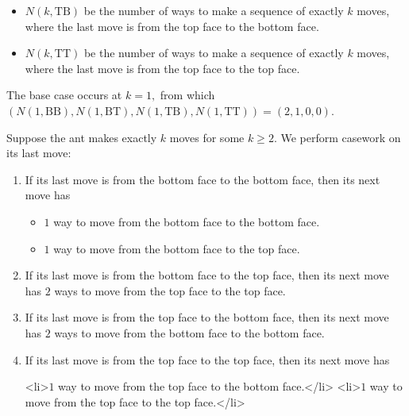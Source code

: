 \begin{enumerate}
            \begin{itemize}
        \item $N(k,\mathrm{TB})$ be the number of ways to make a sequence of exactly $k$ moves, where the last move is from the top face to the bottom face.
            \end{itemize}
            
            \begin{itemize}
        \item $N(k,\mathrm{TT})$ be the number of ways to make a sequence of exactly $k$ moves, where the last move is from the top face to the top face.
            \end{itemize}
            The base case occurs at $k=1,$ from which $\left(N(1,\mathrm{BB}),N(1,\mathrm{BT}),N(1,\mathrm{TB}),N(1,\mathrm{TT})\right)=(2,1,0,0).$ 

 Suppose the ant makes exactly $k$ moves for some $k\geq2.$ We perform casework on its last move:

 
            \begin{enumerate} 
        \item If its last move is from the bottom face to the bottom face, then its next move has

            \begin{itemize} 
        \item $1$ way to move from the bottom face to the bottom face.

        \item $1$ way to move from the bottom face to the top face.

            \end{itemize}
             
        \item If its last move is from the bottom face to the top face, then its next move has $2$ ways to move from the top face to the top face.

        \item If its last move is from the top face to the bottom face, then its next move has $2$ ways to move from the bottom face to the bottom face.

        \item If its last move is from the top face to the top face, then its next move has

 
            \begin{itemize} <li>$1$ way to move from the top face to the bottom face.</li>
<li>$1$ way to move from the top face to the top face.</li>


\end{itemize}
\end{enumerate}
\end{enumerate}
